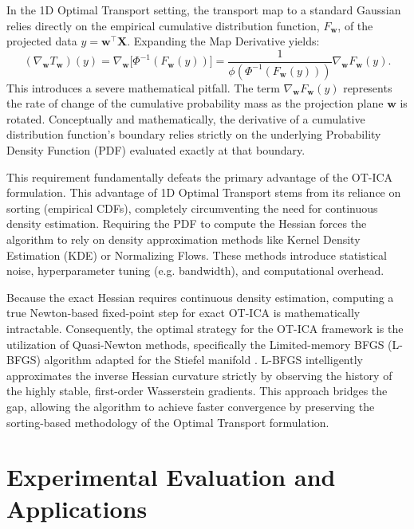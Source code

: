 \documentclass[12pt,a4paper,twoside,openany]{book}
\begin{document}
In the 1D Optimal Transport setting, the transport map to a standard Gaussian relies directly on the empirical cumulative distribution function, $F_{\mathbf{w}}$, 
of the projected data $y = \mathbf{w}^\top \mathbf{X}$. Expanding the Map Derivative yields:
\begin{equation}
    (\nabla_{\mathbf{w}} T_{\mathbf{w}})(y) = \nabla_{\mathbf{w}} \big[ \Phi^{-1}(F_{\mathbf{w}}(y)) \big] = \frac{1}{\phi(\Phi^{-1}(F_{\mathbf{w}}(y)))} \nabla_{\mathbf{w}} F_{\mathbf{w}}(y).
\end{equation}
This introduces a severe mathematical pitfall. The term $\nabla_{\mathbf{w}} F_{\mathbf{w}}(y)$ represents the rate of change of the 
cumulative probability mass as the projection plane $\mathbf{w}$ is rotated. Conceptually and mathematically, the derivative of a 
cumulative distribution function's boundary relies strictly on the underlying Probability Density Function (PDF) evaluated exactly at that boundary. 

This requirement fundamentally defeats the primary advantage of the OT-ICA formulation. 
This advantage of 1D Optimal Transport stems from its reliance on sorting (empirical CDFs), completely circumventing the need for continuous density estimation. 
Requiring the PDF to compute the Hessian forces the algorithm to rely on density approximation methods like Kernel Density Estimation (KDE) or Normalizing Flows. 
These methods introduce statistical noise, hyperparameter tuning (e.g. bandwidth), and computational overhead.

Because the exact Hessian requires continuous density estimation, computing a true Newton-based fixed-point step for exact OT-ICA is mathematically intractable. 
Consequently, the optimal strategy for the OT-ICA framework is the utilization of Quasi-Newton methods, specifically 
the Limited-memory BFGS (L-BFGS) algorithm \cite{liu1989limited} adapted for the Stiefel manifold \cite[Chapter 6]{absil2008optimization}. 
L-BFGS intelligently approximates the inverse Hessian curvature strictly by observing the history of the highly stable, first-order Wasserstein gradients. 
This approach bridges the gap, allowing the algorithm to achieve faster convergence by preserving the sorting-based methodology of the Optimal Transport formulation.

\chapter{Experimental Evaluation and Applications}
\end{document}
